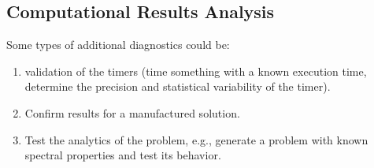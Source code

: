 \subsection{Computational Results Analysis} \label{sec:appendix/analysis}

Some types of additional diagnostics could be:
\begin{enumerate}
\item validation of the timers (time something with a known execution time, determine the precision and statistical variability of the timer).
\item Confirm results for a manufactured solution.
\item Test the analytics of the problem, e.g., generate a problem with known spectral properties and test its behavior.
\end{enumerate}
